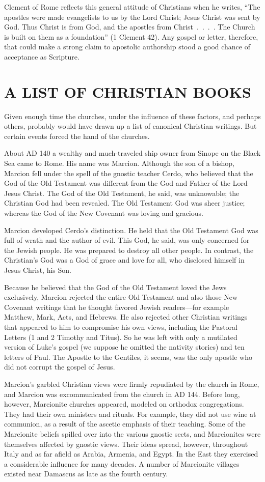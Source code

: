 Clement of Rome reflects this general attitude of Christians when he writes, “The apostles were made
evangelists to us by the Lord Christ; Jesus Christ was sent by God. Thus Christ is from God, and the
apostles from Christ~.~.~.~. The Church is built on them as a foundation” (1 Clement 42). Any gospel
or letter, therefore, that could make a strong claim to apostolic authorship stood a good chance of
acceptance as Scripture.

\section{A LIST OF CHRISTIAN BOOKS}

Given enough time the churches, under the influence of these factors, and perhaps others, probably
would have drawn up a list of canonical Christian writings. But certain events forced the hand of
the churches.

About AD 140 a wealthy and much-traveled ship owner from Sinope on the Black Sea came to Rome. His
name was Marcion. Although the son of a bishop, Marcion fell under the spell of the gnostic teacher
Cerdo, who believed that the God of the Old Testament was different from the God and Father of the
Lord Jesus Christ. The God of the Old Testament, he said, was unknowable; the Christian God had been
revealed. The Old Testament God was sheer justice; whereas the God of the New Covenant was loving
and gracious.

Marcion developed Cerdo’s distinction. He held that the Old Testament God was full of wrath and the
author of evil. This God, he said, was only concerned for the Jewish people. He was prepared to
destroy all other people. In contrast, the Christian’s God was a God of grace and love for all, who
disclosed himself in Jesus Christ, his Son.

Because he believed that the God of the Old Testament loved the Jews exclusively, Marcion rejected
the entire Old Testament and also those New Covenant writings that he thought favored Jewish
readers—for example Matthew, Mark, Acts, and Hebrews. He also rejected other Christian writings that
appeared to him to compromise his own views, including the Pastoral Letters (1 and 2 Timothy and
Titus). So he was left with only a mutilated version of Luke’s gospel (we suppose he omitted the
nativity stories) and ten letters of Paul. The Apostle to the Gentiles, it seems, was the only
apostle who did not corrupt the gospel of Jesus.

Marcion’s garbled Christian views were firmly repudiated by the church in Rome, and Marcion was
excommunicated from the church in AD 144. Before long, however, Marcionite churches appeared,
modeled on orthodox congregations. They had their own ministers and rituals. For example, they did
not use wine at communion, as a result of the ascetic emphasis of their teaching. Some of the
Marcionite beliefs spilled over into the various gnostic sects, and Marcionites were themselves
affected by gnostic views. Their ideas spread, however, throughout Italy and as far afield as
Arabia, Armenia, and Egypt. In the East they exercised a considerable influence for many decades. A
number of Marcionite villages existed near Damascus as late as the fourth century.

